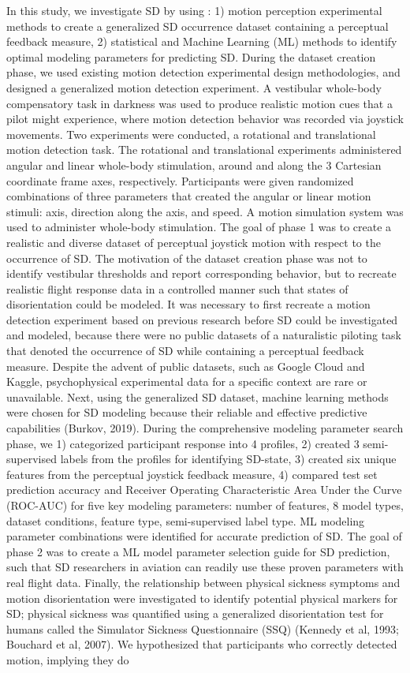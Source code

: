 \documentclass[11pt, onecolumn]{article}
\begin{document}
In this study, we investigate SD by using : 1) motion perception experimental methods to create a generalized SD occurrence dataset containing a perceptual feedback measure, 2) statistical and Machine Learning (ML) methods to identify optimal modeling parameters for predicting SD.  During the dataset creation phase, we used existing motion detection experimental design methodologies, and designed a generalized motion detection experiment.  A vestibular whole-body compensatory task in darkness was used to produce realistic motion cues that a pilot might experience, where motion detection behavior was recorded via joystick movements.  Two experiments were conducted, a rotational and translational motion detection task.  The rotational and translational experiments administered angular and linear whole-body stimulation, around and along the 3 Cartesian coordinate frame axes, respectively.  Participants were given randomized combinations of three parameters that created the angular or linear motion stimuli: axis, direction along the axis, and speed.  A motion simulation system was used to administer whole-body stimulation.  The goal of phase 1 was to create a realistic and diverse dataset of perceptual joystick motion with respect to the occurrence of SD.  The motivation of the dataset creation phase was not to identify vestibular thresholds and report corresponding behavior, but to recreate realistic flight response data in a controlled manner such that states of disorientation could be modeled.  It was necessary to first recreate a motion detection experiment based on previous research before SD could be investigated and modeled, because there were no public datasets of a naturalistic piloting task that denoted the occurrence of SD while containing a perceptual feedback measure.  Despite the advent of public datasets, such as Google Cloud and Kaggle, psychophysical experimental data for a specific context are rare or unavailable.  Next, using the generalized SD dataset, machine learning methods were chosen for SD modeling because their reliable and effective predictive capabilities (Burkov, 2019).  During the comprehensive modeling parameter search phase, we 1) categorized participant response into 4 profiles, 2) created 3 semi-supervised labels from the profiles for identifying SD-state, 3) created six unique features from the perceptual joystick feedback measure, 4) compared test set prediction accuracy and Receiver Operating Characteristic Area Under the Curve (ROC-AUC) for five key modeling parameters: number of features, 8 model types, dataset conditions, feature type, semi-supervised label type.  ML modeling parameter combinations were identified for accurate prediction of SD.  The goal of phase 2 was to create a ML model parameter selection guide for SD prediction, such that SD researchers in aviation can readily use these proven parameters with real flight data.  Finally, the relationship between physical sickness symptoms and motion disorientation were investigated to identify potential physical markers for SD; physical sickness was quantified using a generalized disorientation test for humans called the Simulator Sickness Questionnaire (SSQ) (Kennedy et al, 1993; Bouchard et al, 2007).  We hypothesized that participants who correctly detected motion, implying they do 
\end{document}
